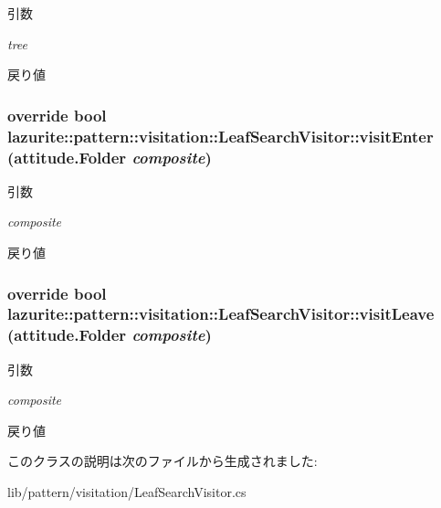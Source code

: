 \begin{DoxyParams}{引数}
\item[{\em tree}]\end{DoxyParams}
\begin{DoxyReturn}{戻り値}

\end{DoxyReturn}
\hypertarget{classlazurite_1_1pattern_1_1visitation_1_1_leaf_search_visitor_a8dfcf50abeb69e84650fc98acc0e76d5}{
\subsubsection[{visitEnter}]{\setlength{\rightskip}{0pt plus 5cm}override bool lazurite::pattern::visitation::LeafSearchVisitor::visitEnter ({\bf attitude.Folder} {\em composite})}}
\label{classlazurite_1_1pattern_1_1visitation_1_1_leaf_search_visitor_a8dfcf50abeb69e84650fc98acc0e76d5}

\begin{DoxyParams}{引数}
\item[{\em composite}]\end{DoxyParams}
\begin{DoxyReturn}{戻り値}

\end{DoxyReturn}
\hypertarget{classlazurite_1_1pattern_1_1visitation_1_1_leaf_search_visitor_a95d360067f5676e54d89833c10e0456e}{
\subsubsection[{visitLeave}]{\setlength{\rightskip}{0pt plus 5cm}override bool lazurite::pattern::visitation::LeafSearchVisitor::visitLeave ({\bf attitude.Folder} {\em composite})}}
\label{classlazurite_1_1pattern_1_1visitation_1_1_leaf_search_visitor_a95d360067f5676e54d89833c10e0456e}

\begin{DoxyParams}{引数}
\item[{\em composite}]\end{DoxyParams}
\begin{DoxyReturn}{戻り値}

\end{DoxyReturn}


このクラスの説明は次のファイルから生成されました:\begin{DoxyCompactItemize}
\item 
lib/pattern/visitation/LeafSearchVisitor.cs\end{DoxyCompactItemize}
